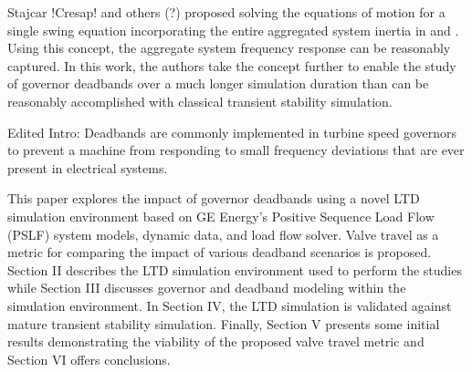Stajcar !Cresap! and others (?) proposed solving the equations of motion for a single swing equation incorporating the entire aggregated system inertia in \cite{AGCCresap} and \cite{CarsonTaylor}. 
Using this concept, the aggregate system frequency response can be reasonably captured. 
In this work, the authors take the concept further to enable the study of governor deadbands over a much longer simulation duration than can be reasonably accomplished with classical transient stability simulation. 

Edited Intro:
Deadbands are commonly implemented in turbine speed governors to prevent a machine from responding to small frequency deviations that are ever present in electrical systems.

This paper explores the impact of governor deadbands using a novel LTD simulation environment based on GE Energy's Positive Sequence Load Flow (PSLF) system models, dynamic data, and load flow solver. 
Valve travel as a metric for comparing the impact of various deadband scenarios is proposed. 
Section II describes the LTD simulation environment used to perform the studies while
Section III discusses governor and deadband modeling within the simulation environment. 
In Section IV, the LTD simulation is validated against mature transient stability simulation. 
Finally, Section V presents some initial results demonstrating the viability of the proposed valve travel metric and Section VI offers conclusions.